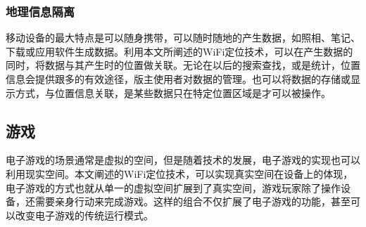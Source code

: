 \documentclass[UTF8, twocolumn ]{ctexart}
\begin{document}
\subsubsection{地理信息隔离}
移动设备的最大特点是可以随身携带，可以随时随地的产生数据，如照相、笔记、下载或应用软件生成数据。利用本文所阐述的WiFi定位技术，可以在产生数据的同时，将数据与其产生时的位置做关联。无论在以后的搜索查找，或是统计，位置信息会提供跟多的有效途径，版主使用者对数据的管理。也可以将数据的存储或显示方式，与位置信息关联，是某些数据只在特定位置区域是才可以被操作。
\subsection{游戏}
电子游戏的场景通常是虚拟的空间，但是随着技术的发展，电子游戏的实现也可以利用现实空间。本文阐述的WiFi定位技术，可以实现真实空间在设备上的体现，电子游戏的方式也就从单一的虚拟空间扩展到了真实空间，游戏玩家除了操作设备，还需要亲身行动来完成游戏。这样的组合不仅扩展了电子游戏的功能，甚至可以改变电子游戏的传统运行模式。
\end{document}
